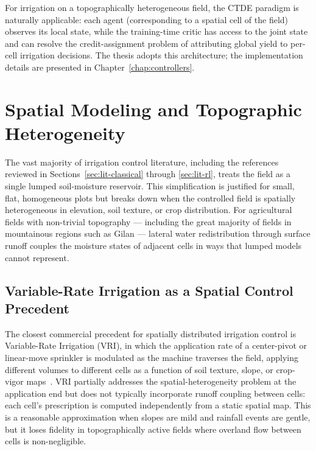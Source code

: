 For irrigation on a topographically heterogeneous field, the CTDE
paradigm is naturally applicable: each agent (corresponding to a
spatial cell of the field) observes its local state, while the
training-time critic has access to the joint state and can resolve
the credit-assignment problem of attributing global yield to per-cell
irrigation decisions. The thesis adopts this architecture; the
implementation details are presented in Chapter~\ref{chap:controllers}.

\section{Spatial Modeling and Topographic Heterogeneity}
\label{sec:lit-spatial}

The vast majority of irrigation control literature, including the
references reviewed in Sections~\ref{sec:lit-classical} through
\ref{sec:lit-rl}, treats the field as a single lumped soil-moisture
reservoir. This simplification is justified for small, flat,
homogeneous plots but breaks down when the controlled field is
spatially heterogeneous in elevation, soil texture, or crop
distribution. For agricultural fields with non-trivial topography ---
including the great majority of fields in mountainous regions such as
Gilan --- lateral water redistribution through surface runoff couples
the moisture states of adjacent cells in ways that lumped models
cannot represent.

\subsection{Variable-Rate Irrigation as a Spatial Control Precedent}

The closest commercial precedent for spatially distributed irrigation
control is Variable-Rate Irrigation (VRI), in which the application
rate of a center-pivot or linear-move sprinkler is modulated as the
machine traverses the field, applying different volumes to different
cells as a function of soil texture, slope, or
crop-vigor maps~\cite{Sharma2025,Bayar2025}. VRI partially addresses
the spatial-heterogeneity problem at the application end but does not
typically incorporate runoff coupling between cells: each cell's
prescription is computed independently from a static spatial map.
This is a reasonable approximation when slopes are mild and rainfall
events are gentle, but it loses fidelity in topographically active
fields where overland flow between cells is non-negligible.

